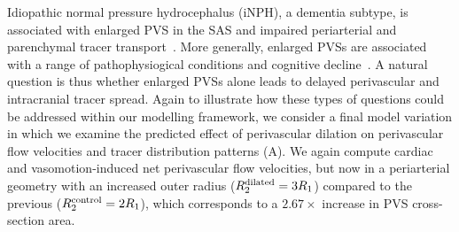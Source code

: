 \documentclass[fleqn,10pt]{wlscirep}
\begin{document}
Idiopathic normal pressure hydrocephalus (iNPH), a dementia subtype,
is associated with enlarged PVS in the SAS and impaired periarterial
and parenchymal tracer transport~\cite{eide2024functional}. More
generally, enlarged PVSs are associated with a range of
pathophysiogical conditions and cognitive
decline~\cite{bown2022physiology}. A natural question is thus whether
enlarged PVSs alone leads to delayed perivascular and intracranial
tracer spread. Again to illustrate how these types of questions could
be addressed within our modelling framework, we consider a final model
variation in which we examine the predicted effect of perivascular
dilation on perivascular flow velocities and tracer distribution
patterns (A). We again compute cardiac and
vasomotion-induced net perivascular flow velocities, but now in a
periarterial geometry with an increased outer radius ($R^{\rm
  dilated}_2 = 3 R_1$) compared to the previous ($R^{\rm control}_2 =
2 R_1$), which corresponds to a $2.67 \times$ increase in PVS
cross-section area.
\end{document}
